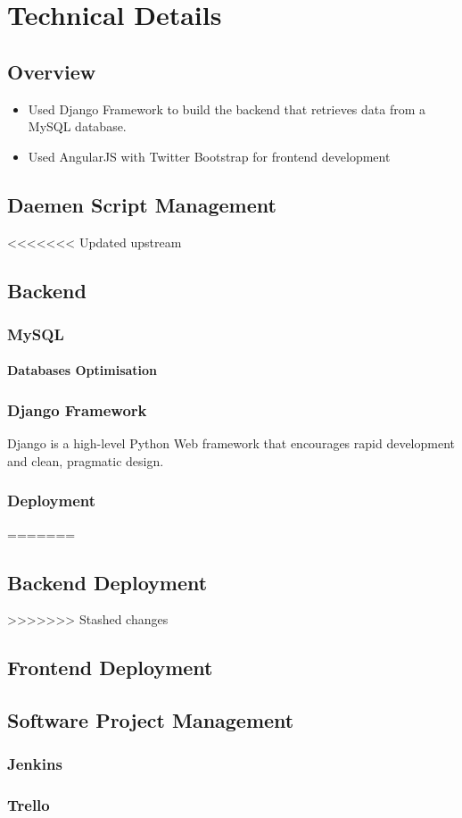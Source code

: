 \chapter{Technical Details}

\section{Overview}
\begin{itemize}
\item Used Django Framework to build the backend that retrieves data from a MySQL database.

\item Used AngularJS with Twitter Bootstrap for frontend development
\end{itemize}

\section{Daemen Script Management}

<<<<<<< Updated upstream
\section{Backend}
\subsection{MySQL}
\subsubsection{Databases Optimisation}
\subsection{Django Framework}
\par Django is a high-level Python Web framework that encourages rapid development and clean, pragmatic design\cite{django_framework}.
\subsection{Deployment}
=======
\section{Backend Deployment}
>>>>>>> Stashed changes

\section{Frontend Deployment}


\section{Software Project Management}
\subsection{Jenkins}
\subsection{Trello}